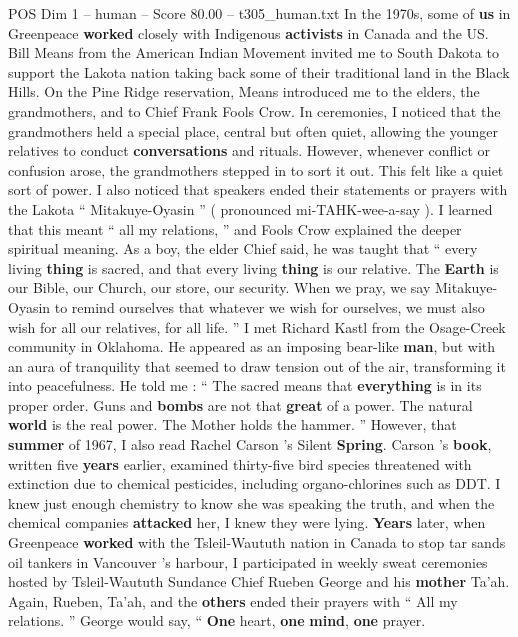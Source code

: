 \begin{textsample}{POS Dim 1 – human – Score 80.00 – t305\_human.txt}
In the 1970s, some of \textbf{us} in Greenpeace \textbf{worked} closely with Indigenous \textbf{activists} in Canada and the US.
Bill Means from the American Indian Movement invited me to South Dakota to support the Lakota nation taking back some of their traditional land in the Black Hills.
On the Pine Ridge reservation, Means introduced me to the elders, the grandmothers, and to Chief Frank Fools Crow.
In ceremonies, I noticed that the grandmothers held a special place, central but often quiet, allowing the younger relatives to conduct \textbf{conversations} and rituals.
However, whenever conflict or confusion arose, the grandmothers stepped in to sort it out.
This felt like a quiet sort of power.
I also noticed that speakers ended their statements or prayers with the Lakota “ Mitakuye-Oyasin ” ( pronounced mi-TAHK-wee-a-say ).
I learned that this meant “ all my relations, ” and Fools Crow explained the deeper spiritual meaning.
As a boy, the elder Chief said, he was taught that “ every living \textbf{thing} is sacred, and that every living \textbf{thing} is our relative.
The \textbf{Earth} is our Bible, our Church, our store, our security.
When we pray, we say Mitakuye-Oyasin to remind ourselves that whatever we wish for ourselves, we must also wish for all our relatives, for all life. ” I met Richard Kastl from the Osage-Creek community in Oklahoma.
He appeared as an imposing bear-like \textbf{man}, but with an aura of tranquility that seemed to draw tension out of the air, transforming it into peacefulness.
He told me : “ The sacred means that \textbf{everything} is in its proper order.
Guns and \textbf{bombs} are not that \textbf{great} of a power.
The natural \textbf{world} is the real power.
The Mother holds the hammer. ” However, that \textbf{summer} of 1967, I also read Rachel Carson ’s Silent \textbf{Spring}.
Carson ’s \textbf{book}, written five \textbf{years} earlier, examined thirty-five bird species threatened with extinction due to chemical pesticides, including organo-chlorines such as DDT.
I knew just enough chemistry to know she was speaking the truth, and when the chemical companies \textbf{attacked} her, I knew they were lying. \textbf{Years} later, when Greenpeace \textbf{worked} with the Tsleil-Waututh nation in Canada to stop tar sands oil tankers in Vancouver ’s harbour, I participated in weekly sweat ceremonies hosted by Tsleil-Waututh Sundance Chief Rueben George and his \textbf{mother} Ta’ah.
Again, Rueben, Ta’ah, and the \textbf{others} ended their prayers with “ All my relations. ” George would say, “ \textbf{One} heart, \textbf{one} \textbf{mind}, \textbf{one} prayer.

\end{textsample}

